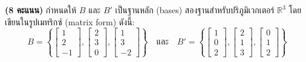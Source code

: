 \documentclass[12pt, a4paper]{exam}
\begin{document}
\begin{questions}
\question \textbf{(8 คะแนน)} กำหนดให้ $B$ และ $B'$ เป็นฐานหลัก (bases) สองฐานสำหรับปริภูมิเวกเตอร์ $\mathbb{R}^3$ โดยเขียนในรูปเมทริกซ์ (matrix form) ดังนี้:
\[
B = \left\{ \begin{bmatrix} 1 \\ 2 \\ -1 \end{bmatrix}, \begin{bmatrix} 2 \\ 3 \\ 0 \end{bmatrix}, \begin{bmatrix} 1 \\ 3 \\ -2 \end{bmatrix} \right\}
\quad \text{และ} \quad
B' = \left\{ \begin{bmatrix} 1 \\ 0 \\ 2 \end{bmatrix}, \begin{bmatrix} 2 \\ 1 \\ 3 \end{bmatrix}, \begin{bmatrix} 0 \\ 1 \\ 2 \end{bmatrix} \right\}
\]
\newpage


\end{questions}
\end{document}
